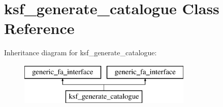 \hypertarget{classksf__generate__catalogue}{}\section{ksf\+\_\+generate\+\_\+catalogue Class Reference}
\label{classksf__generate__catalogue}
Inheritance diagram for ksf\+\_\+generate\+\_\+catalogue\+:\begin{figure}[H]
\begin{center}
\leavevmode
\includegraphics[height=2.000000cm]{d1/dec/classksf__generate__catalogue}
\end{center}
\end{figure}
